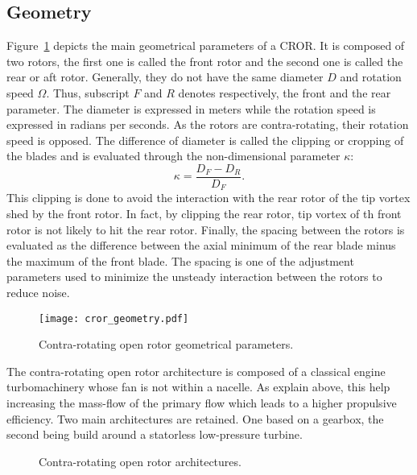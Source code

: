 
\subsection{Geometry}
\label{sub:cror_geometry}

Figure~\ref{fig:cror_geometry} depicts the main
geometrical parameters of a CROR.
It is composed of two rotors, the first one is called
the front rotor and the second one is called the rear or aft rotor.
Generally, they do not have the same diameter $D$ and rotation speed
$\Omega$. Thus, subscript $F$ and $R$ denotes respectively,
the front and the rear parameter. The diameter is expressed in meters
while the rotation speed is expressed in radians per seconds.
As the rotors are contra-rotating, their rotation speed is opposed.
The difference of diameter is called the clipping or cropping
of the blades and is evaluated through the non-dimensional parameter
$\kappa$:
\begin{equation}
    \kappa = \frac{D_F - D_R}{D_F}.
\end{equation}
This clipping is done to avoid the interaction 
with the rear rotor of the tip vortex shed
by the front rotor. In fact, by clipping the rear
rotor, tip vortex of th front rotor is not likely
to hit the rear rotor.
Finally, the spacing between the rotors
is evaluated as the difference between the axial minimum of the
rear blade minus the maximum of the front blade. The spacing
is one of the adjustment parameters used to minimize the unsteady
interaction between the rotors to reduce noise.
\begin{figure}[htbp]
  \centering
  \texttt{[image: cror\_geometry.pdf]}
  \caption{Contra-rotating open rotor geometrical parameters.}
  \label{fig:cror_geometry}
\end{figure}

The contra-rotating open rotor architecture is composed of a classical engine
turbomachinery whose fan is not within a nacelle. As explain
above, this help increasing the mass-flow of the primary flow
which leads to a higher propulsive efficiency.
Two main architectures are retained. One based on a gearbox, the second
being build around a statorless low-pressure turbine.
\begin{figure}[htb]
  \centering
  \caption{Contra-rotating open rotor architectures.}
  \label{fig:cror_architectures}
\end{figure}


